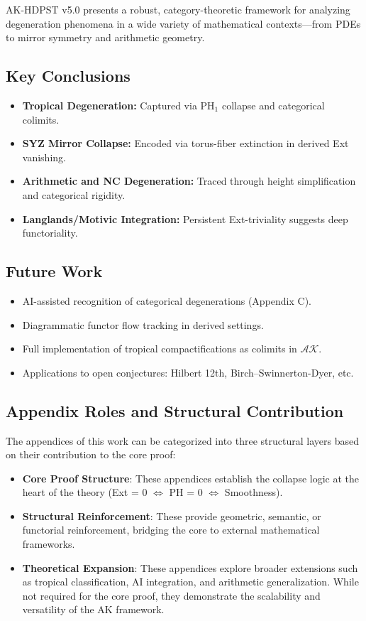 \documentclass[11pt]{article}
\begin{document}
AK-HDPST v5.0 presents a robust, category-theoretic framework for analyzing degeneration phenomena in a wide variety of mathematical contexts—from PDEs to mirror symmetry and arithmetic geometry.

\subsection*{Key Conclusions}
\begin{itemize}
    \item \textbf{Tropical Degeneration:} Captured via PH\(_1\) collapse and categorical colimits.
    \item \textbf{SYZ Mirror Collapse:} Encoded via torus-fiber extinction in derived Ext vanishing.
    \item \textbf{Arithmetic and NC Degeneration:} Traced through height simplification and categorical rigidity.
    \item \textbf{Langlands/Motivic Integration:} Persistent Ext-triviality suggests deep functoriality.
\end{itemize}

\subsection*{Future Work}
\begin{itemize}
    \item AI-assisted recognition of categorical degenerations (Appendix C).
    \item Diagrammatic functor flow tracking in derived settings.
    \item Full implementation of tropical compactifications as colimits in \( \mathcal{AK} \).
    \item Applications to open conjectures: Hilbert 12th, Birch–Swinnerton-Dyer, etc.
\end{itemize}



\subsection*{Appendix Roles and Structural Contribution}

The appendices of this work can be categorized into three structural layers based on their contribution to the core proof:

\begin{itemize}
  \item \textbf{Core Proof Structure}: These appendices establish the collapse logic at the heart of the theory (Ext = 0 $\Leftrightarrow$ PH = 0 $\Leftrightarrow$ Smoothness).
  \item \textbf{Structural Reinforcement}: These provide geometric, semantic, or functorial reinforcement, bridging the core to external mathematical frameworks.
  \item \textbf{Theoretical Expansion}: These appendices explore broader extensions such as tropical classification, AI integration, and arithmetic generalization. While not required for the core proof, they demonstrate the scalability and versatility of the AK framework.
\end{itemize}
\end{document}

